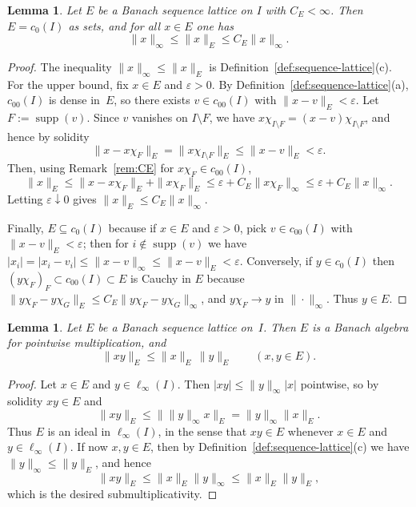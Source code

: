 \documentclass[reqno]{amsart}
\theoremstyle{plain}
\newtheorem{lemma}[theorem]{Lemma}
\theoremstyle{definition}
\theoremstyle{remark}
\renewcommand{\le}{\leqslant}
\newcommand{\supp}{\operatorname{supp}}
\begin{document}
\begin{lemma}\label{lem:CE-equivalence}
Let $E$ be a Banach sequence lattice on $I$ with $C_E<\infty$.
Then $E=c_0(I)$ as sets, and for all $x\in E$ one has
\[
\|x\|_\infty\le \|x\|_E\le C_E\|x\|_\infty.
\]
\end{lemma}

\begin{proof}
The inequality $\|x\|_\infty\le \|x\|_E$ is Definition~\ref{def:sequence-lattice}(c).
For the upper bound, fix $x\in E$ and $\varepsilon>0$.
By Definition~\ref{def:sequence-lattice}(a), $c_{00}(I)$ is dense in~$E$, so there exists
$v\in c_{00}(I)$ with $\|x-v\|_E<\varepsilon$.
Let $F:=\supp(v)$. Since $v$ vanishes on $I\setminus F$, we have
$x\chi_{I\setminus F}=(x-v)\chi_{I\setminus F}$, and hence by solidity
\[
\|x-x\chi_F\|_E = \|x\chi_{I\setminus F}\|_E \le \|x-v\|_E < \varepsilon.
\]
Then, using Remark~\ref{rem:CE} for $x\chi_F\in c_{00}(I)$,
\[
\|x\|_E \le \|x-x\chi_F\|_E+\|x\chi_F\|_E
\le \varepsilon + C_E\|x\chi_F\|_\infty
\le \varepsilon + C_E\|x\|_\infty.
\]
Letting $\varepsilon\downarrow 0$ gives $\|x\|_E\le C_E\|x\|_\infty$.

Finally, $E\subseteq c_0(I)$ because if $x\in E$ and $\varepsilon>0$, pick $v\in c_{00}(I)$ with
$\|x-v\|_E<\varepsilon$; then for $i\notin\supp(v)$ we have
$|x_i|=|x_i-v_i|\le \|x-v\|_\infty\le \|x-v\|_E<\varepsilon$.
Conversely, if $y\in c_0(I)$ then $(y\chi_F)_F\subset c_{00}(I)\subset E$ is Cauchy in $E$ because
$\|y\chi_F-y\chi_G\|_E\le C_E\|y\chi_F-y\chi_G\|_\infty$, and $y\chi_F\to y$ in $\|\cdot\|_\infty$.
Thus $y\in E$.
\end{proof}


\begin{lemma}\label{lem:pointwise}
Let $E$ be a Banach sequence lattice on~$I$.
Then $E$ is a Banach algebra for pointwise multiplication, and
\[
\|xy\|_E\le \|x\|_E\,\|y\|_E \qquad (x,y\in E).
\]
\end{lemma}

\begin{proof}
Let $x\in E$ and $y\in \ell_\infty(I)$. Then $|xy|\le \|y\|_\infty |x|$ pointwise, so by solidity
$xy\in E$ and
\[
\|xy\|_E \le \|\|y\|_\infty x\|_E = \|y\|_\infty \|x\|_E.
\]
Thus $E$ is an ideal in $\ell_\infty(I)$, in the sense that $xy\in E$ whenever $x\in E$ and $y\in\ell_\infty(I)$. If now $x,y\in E$, then by Definition~\ref{def:sequence-lattice}(c)
we have $\|y\|_\infty\le \|y\|_E$, and hence
\[
\|xy\|_E\le \|x\|_E\|y\|_\infty \le \|x\|_E\|y\|_E,
\]
which is the desired submultiplicativity.
\end{proof}
\end{document}
